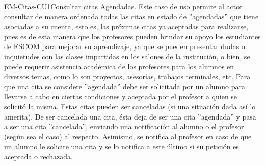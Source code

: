 \begin{UseCase}{EM-Citas-CU1}{Consultar citas Agendadas.}
	{
	\noindent
	Este caso de uso permite al actor consultar de manera ordenada todas las citas en estado de ''agendadas'' que tiene asociadas a su cuenta, esto es, las próximas citas ya aceptadas para realizarse, pues es de esta manera que los profesores pueden brindar su apoyo los estudiantes de ESCOM para mejorar su aprendizaje, ya que se pueden presentar dudas o inquietudes con las clases impartidas en los salones de la institución, o bien, se puede requerir asistencia académica de los profesores para los alumnos en diversos temas, como lo son proyectos, asesorías, trabajos terminales, etc. 
	\newline
	Para que una cita se considere ''agendada'' debe ser solicitada por un alumno para llevarse a cabo en ciertas condiciones y aceptada por el profesor a quien se solicitó la misma. Estas citas pueden ser canceladas (si una situación dada así lo amerita). De ser cancelada una cita, ésta deja de ser una cita ''agendada'' y pasa a ser una cita ''cancelada'', enviando una notificación al alumno o el profesor (según sea el caso) al respecto. Asimismo, se notifica al profesor en caso de que un alumno le solicite una cita y se lo notifica a este último si su petición es aceptada o rechazada. 
	\newline
	}
\end{UseCase}

